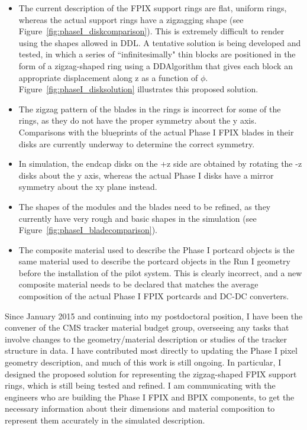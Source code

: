 \begin{itemize}
\item The current description of the FPIX support rings are flat, uniform rings, whereas the actual support rings have a zigzagging shape (see Figure~\ref{fig:phaseI_diskcomparison}). This is extremely difficult to render using the shapes allowed in DDL. A tentative solution is being developed and tested, in which a series of ``infinitesimally" thin blocks are positioned in the form of a zigzag-shaped ring using a DDAlgorithm that gives each block an appropriate displacement along z as a function of $\phi$. Figure~\ref{fig:phaseI_disksolution} illustrates this proposed solution.
\item The zigzag pattern of the blades in the rings is incorrect for some of the rings, as they do not have the proper symmetry about the y axis. Comparisons with the blueprints of the actual Phase I FPIX blades in their disks are currently underway to determine the correct symmetry.
\item In simulation, the endcap disks on the +z side are obtained by rotating the -z disks about the y axis, whereas the actual Phase I disks have a mirror symmetry about the xy plane instead.
\item The shapes of the modules and the blades need to be refined, as they currently have very rough and basic shapes in the simulation (see Figure~\ref{fig:phaseI_bladecomparison}).
\item The composite material used to describe the Phase I portcard objects is the same material used to describe the portcard objects in the Run I geometry before the installation of the pilot system. This is clearly incorrect, and a new composite material needs to be declared that matches the average composition of the actual Phase I FPIX portcards and DC-DC converters.
\end{itemize}

Since January 2015 and continuing into my postdoctoral position, I have been the convener of the CMS tracker material budget group, overseeing any tasks that involve changes to the geometry/material description or studies of the tracker structure in data. I have contributed most directly to updating the Phase I pixel geometry description, and much of this work is still ongoing. In particular, I designed the proposed solution for representing the zigzag-shaped FPIX support rings, which is still being tested and refined. I am communicating with the engineers who are building the Phase I FPIX and BPIX components, to get the necessary information about their dimensions and material composition to represent them accurately in the simulated description.

